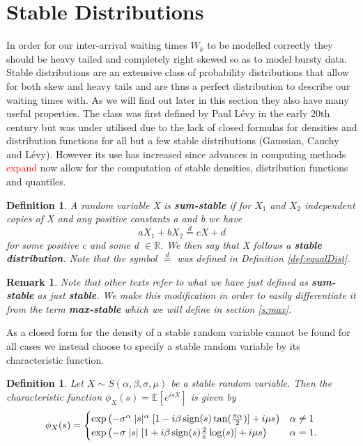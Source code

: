 \documentclass[honours,12pt]{unswthesis}
\newcommand{\R}{\mathbb{R}}
\newcommand{\E}{\mathbb{E}}
\newcommand{\1}{\mathbf 1}
\newcommand{\sign}{\mathop{\rm sign}}
\newtheorem{definition}[equation]{Definition}
\newtheorem{remark}[equation]{Remark}
\numberwithin{equation}{section}
\theoremstyle{definition}
\theoremstyle{remark}
\begin{document}
\section{Stable Distributions}
In order for our inter-arrival waiting times $W_k$ to be modelled correctly they should be heavy tailed and completely right skewed so as to model bursty data.
Stable distributions are an extensive class of probability distributions that allow for both skew and heavy tails and are thus a perfect distribution to describe our waiting times with. As we will find out later in this section they also have many useful properties. The class was first defined by Paul L\'{e}vy in the early 20th century but was under utilised due to the lack of closed formulas for densities and distribution functions for all but a few stable distributions (Gaussian, Cauchy and L\'{e}vy). However its use has increased since advances in computing methods \textcolor{red}{expand} now allow for the computation of stable densities, distribution functions and quantiles.\\
\begin{definition}\cite{Nolan2015}
A random variable X is \textbf{sum-stable} if for $X_1$ and $X_2$ independent copies of X and any positive constants a and b we have
\[
	aX_1+bX_2\overset{d}{=}cX+d
\]
for some positive c and some d $\in\R.$ We then say that X follows a \textbf{stable distribution}. Note that the symbol $\overset{d}{=}$ was defined in Definition \ref{def:equalDist}.\\
\end{definition}
\begin{remark}
Note that other texts refer to what we have just defined as \textbf{sum-stable} as just \textbf{stable}. We make this modification in order to easily differentiate it from the term \textbf{max-stable} which we will define in section \ref{s:max}.\\
\end{remark}

\noindent As a closed form for the density of a stable random variable cannot be found for all cases we instead choose to specify a stable random variable by its characteristic function.\\
\begin{definition}\label{def:stableChar}
Let $X\sim S(\alpha,\beta,\sigma,\mu)$ be a stable random variable. Then the characteristic function $\phi_X(s)=\E[e^{isX}]$ is given by
\begin{align}
	\phi_X(s)=\begin{cases}
			\exp\left(-\sigma^\alpha \; |s|^\alpha \; [1-i\beta \sign(s)\tan(\frac{\pi\alpha}{2})]+i\mu s\right) &\alpha\neq1\\
			\exp\left(-\sigma \; |s| \; [1+i\beta \sign(s)\frac{2}{\pi}\log(s)]+i\mu s\right) &\alpha=1.
			\end{cases} 
\end{align}
\end{definition}
\end{document}

